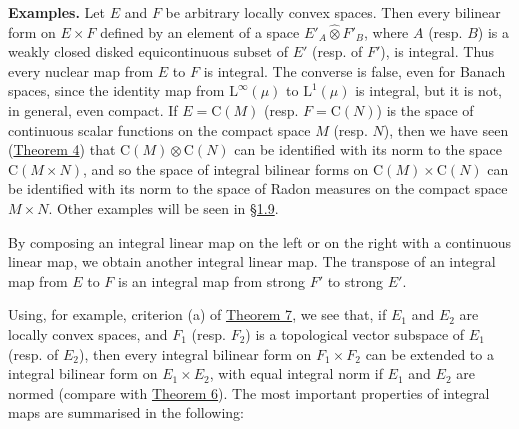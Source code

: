 \documentclass[british]{article}
\newenvironment{rmenv}[1]
  {\phantomsection\par\smallskip\noindent\textbf{#1.}\rmfamily}
  {\par\smallskip}
\newcommand{\oldpage}[1]{\marginpar{\footnotesize$\Big\vert$ \textit{p.~#1}}}
\begin{document}
\begin{rmenv}{Examples}
Let \(E\) and \(F\) be arbitrary locally convex spaces. Then every
bilinear form on \(E\times F\) defined by an element of a space
\(E'_A\hat{\otimes}F'_B\), where \(A\) (resp. \(B\)) is a weakly closed
disked equicontinuous subset of \(E'\) (resp. of \(F'\)), is integral.
Thus every nuclear map from \(E\) to \(F\) is integral. \oldpage{89} The
converse is false, even for Banach spaces, since the identity map from
\(\mathrm{L}^\infty(\mu)\) to \(\mathrm{L}^1(\mu)\) is integral, but it
is not, in general, even compact. If \(E=\mathrm{C}(M)\) (resp.
\(F=\mathrm{C}(N)\)) is the space of continuous scalar functions on the
compact space \(M\) (resp. \(N\)), then we have seen
(\hyperref[section-1-theorem-4]{Theorem 4}) that
\(\mathrm{C}(M)\hat{\otimes}\mathrm{C}(N)\) can be identified with its
norm to the space \(\mathrm{C}(M\times N)\), and so the space of
integral bilinear forms on \(\mathrm{C}(M)\times\mathrm{C}(N)\) can be
identified with its norm to the space of Radon measures on the compact
space \(M\times N\). Other examples will be seen in
\hyperref[section-1.9]{§1.9}.

By composing an integral linear map on the left or on the right with a
continuous linear map, we obtain another integral linear map. The
transpose of an integral map from \(E\) to \(F\) is an integral map from
strong \(F'\) to strong \(E'\).

Using, for example, criterion (a) of
\hyperref[section-1-theorem-7]{Theorem 7}, we see that, if \(E_1\) and
\(E_2\) are locally convex spaces, and \(F_1\) (resp. \(F_2\)) is a
topological vector subspace of \(E_1\) (resp. of \(E_2\)), then every
integral bilinear form on \(F_1\times F_2\) can be extended to a
integral bilinear form on \(E_1\times E_2\), with equal integral norm if
\(E_1\) and \(E_2\) are normed (compare with
\hyperref[section-1-theorem-6]{Theorem 6}). The most important
properties of integral maps are summarised in the following:

\end{rmenv}
\end{document}
